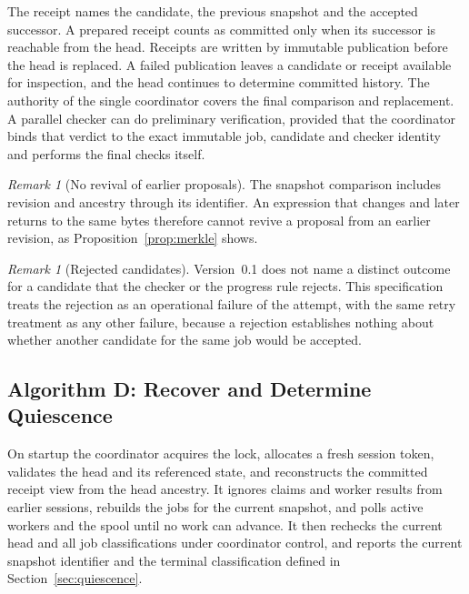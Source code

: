 \documentclass[11pt,a4paper]{article}
\theoremstyle{plain}
\theoremstyle{definition}
\theoremstyle{remark}
\newtheorem{remark}[theorem]{Remark}
\theoremstyle{definition}
\begin{document}
The receipt names the candidate, the previous snapshot and the accepted successor. A prepared receipt counts as committed only when its successor is reachable from the head. Receipts are written by immutable publication before the head is replaced. A failed publication leaves a candidate or receipt available for inspection, and the head continues to determine committed history. The authority of the single coordinator covers the final comparison and replacement. A parallel checker can do preliminary verification, provided that the coordinator binds that verdict to the exact immutable job, candidate and checker identity and performs the final checks itself.

\begin{remark}[No revival of earlier proposals]
The snapshot comparison includes revision and ancestry through its identifier. An expression that changes and later returns to the same bytes therefore cannot revive a proposal from an earlier revision, as Proposition~\ref{prop:merkle} shows.
\end{remark}

\begin{remark}[Rejected candidates]
Version~0.1 does not name a distinct outcome for a candidate that the checker or the progress rule rejects. This specification treats the rejection as an operational failure of the attempt, with the same retry treatment as any other failure, because a rejection establishes nothing about whether another candidate for the same job would be accepted.
\end{remark}

\subsection{Algorithm D: Recover and Determine Quiescence}

On startup the coordinator acquires the lock, allocates a fresh session token, validates the head and its referenced state, and reconstructs the committed receipt view from the head ancestry. It ignores claims and worker results from earlier sessions, rebuilds the jobs for the current snapshot, and polls active workers and the spool until no work can advance. It then rechecks the current head and all job classifications under coordinator control, and reports the current snapshot identifier and the terminal classification defined in Section~\ref{sec:quiescence}.
\end{document}
